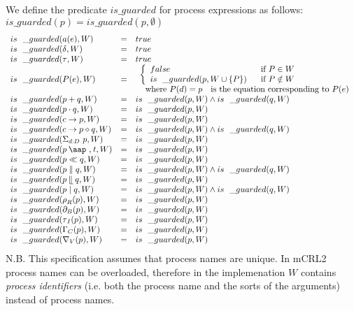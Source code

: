 \documentclass{article}
\providecommand{\at}{\mathbin{\mbox{\aap ,}}}
\providecommand{\leftmerge}{\mathbin{\mathrel{\llfloor}}}
\begin{document}
We define the predicate $is\_guarded$ for process expressions as follows: $%
is\_guarded(p)=is\_guarded(p,\emptyset )$%
\[
\begin{array}{lll}
is\_guarded(a(e),W) & = & true \\
is\_guarded(\delta ,W) & = & true \\
is\_guarded(\tau ,W) & = & true \\
is\_guarded(P(e),W) & = &
\begin{array}{l}
\left\{
\begin{array}{ll}
false & \text{if }P\in W \\
is\_guarded(p,W\cup \{P\}) & \text{if }P\notin W%
\end{array}%
\right. \\
\text{where }P(d)=p\text{ is the equation corresponding to }P(e)%
\end{array}
\\
is\_guarded(p+q,W) & = & is\_guarded(p,W)\wedge is\_guarded(q,W) \\
is\_guarded(p\cdot q,W) & = & is\_guarded(p,W) \\
is\_guarded(c\rightarrow p,W) & = & is\_guarded(p,W) \\
is\_guarded(c\rightarrow p\diamond q,W) & = & is\_guarded(p,W)\wedge
is\_guarded(q,W) \\
is\_guarded(\Sigma _{d:D}\ p,W) & = & is\_guarded(p,W) \\
is\_guarded(p\at t,W) & = & is\_guarded(p,W) \\
is\_guarded(p\ll q,W) & = & is\_guarded(p,W) \\
is\_guarded(p\parallel q,W) & = & is\_guarded(p,W)\wedge is\_guarded(q,W) \\
is\_guarded(p\leftmerge q,W) & = & is\_guarded(p,W) \\
is\_guarded(p\mid q,W) & = & is\_guarded(p,W)\wedge is\_guarded(q,W) \\
is\_guarded(\rho _{R}(p),W) & = & is\_guarded(p,W) \\
is\_guarded(\partial _{B}(p),W) & = & is\_guarded(p,W) \\
is\_guarded(\tau _{I}(p),W) & = & is\_guarded(p,W) \\
is\_guarded(\Gamma _{C}(p),W) & = & is\_guarded(p,W) \\
is\_guarded(\nabla _{V}(p),W) & = & is\_guarded(p,W)%
\end{array}%
\]%
\newline
N.B. This specification assumes that process names are unique. In mCRL2
process names can be overloaded, therefore in the implemenation $W$ contains
\emph{process identifiers} (i.e. both the process name and the sorts of the
arguments) instead of process names.
\end{document}
